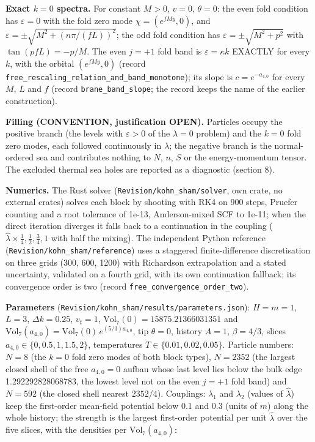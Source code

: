 \documentclass[11pt]{article}
\begin{document}
\textbf{Exact $k = 0$ spectra.} For constant $M > 0$, $v = 0$, $\theta = 0$: the even fold condition has $\varepsilon = 0$ with the fold zero mode $\chi = (e^{fMy}, 0)$, and $\varepsilon = \pm\sqrt{M^2 + (n\pi/(fL))^2}$; the odd fold condition has $\varepsilon = \pm\sqrt{M^2 + p^2}$ with $\tan(pfL) = -p/M$. The even $j = +1$ fold band is $\varepsilon = \kappa k$ EXACTLY for every $k$, with the orbital $(e^{fMy}, 0)$ (record \texttt{free\_res\allowbreak{}caling\_r\allowbreak{}elation\_\allowbreak{}and\_band\allowbreak{}\_monoton\allowbreak{}e}); its slope is $c = e^{-a_{4,0}}$ for every $M$, $L$ and $f$ (record \texttt{brane\_ba\allowbreak{}nd\_slope}; the record keeps the name of the earlier construction).

\textbf{Filling (CONVENTION, justification OPEN).} Particles occupy the positive branch (the levels with $\varepsilon > 0$ of the $\lambda = 0$ problem) and the $k = 0$ fold zero modes, each followed continuously in $\lambda$; the negative branch is the normal-ordered sea and contributes nothing to $N$, $n$, $S$ or the energy-momentum tensor. The excluded thermal sea holes are reported as a diagnostic (section 8).

\textbf{Numerics.} The Rust solver (\texttt{Revision\allowbreak{}/kohn\_sh\allowbreak{}am/solve\allowbreak{}r}, own crate, no external crates) solves each block by shooting with RK4 on 900 steps, Pruefer counting and a root tolerance of 1e-13, Anderson-mixed SCF to 1e-11; when the direct iteration diverges it falls back to a continuation in the coupling ($\hat\lambda \times \frac14, \frac12, \frac34, 1$ with half the mixing). The independent Python reference (\texttt{Revision\allowbreak{}/kohn\_sh\allowbreak{}am/refer\allowbreak{}ence}) uses a staggered finite-difference discretisation on three grids (300, 600, 1200) with Richardson extrapolation and a stated uncertainty, validated on a fourth grid, with its own continuation fallback; its convergence order is two (record \texttt{free\_con\allowbreak{}vergence\allowbreak{}\_order\_t\allowbreak{}wo}).

\textbf{Parameters} (\texttt{Revision\allowbreak{}/kohn\_sh\allowbreak{}am/resul\allowbreak{}ts/param\allowbreak{}eters.js\allowbreak{}on}): $H = m = 1$, $L = 3$, $\Delta k = 0.25$, $v_t = 1$, $\mathrm{Vol}_7(0) = 15875.21366031351$ and $\mathrm{Vol}_7(a_{4,0}) = \mathrm{Vol}_7(0)\,e^{(5/3)a_{4,0}}$, tip $\theta = 0$, history $A = 1$, $\beta = 4/3$, slices $a_{4,0} \in \{0, 0.5, 1, 1.5, 2\}$, temperatures $T \in \{0.01, 0.02, 0.05\}$. Particle numbers: $N = 8$ (the $k = 0$ fold zero modes of both block types), $N = 2352$ (the largest closed shell of the free $a_{4,0} = 0$ aufbau whose last level lies below the bulk edge 1.292292828068783, the lowest level not on the even $j = +1$ fold band) and $N = 592$ (the closed shell nearest $2352/4$). Couplings: $\lambda_1$ and $\lambda_2$ (values of $\hat\lambda$) keep the first-order mean-field potential below 0.1 and 0.3 (units of $m$) along the whole history; the strength is the largest first-order potential per unit $\hat\lambda$ over the five slices, with the densities per $\mathrm{Vol}_7(a_{4,0})$:
\end{document}
